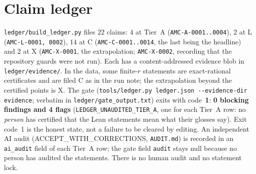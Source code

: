 \documentclass[10pt]{article}
\begin{document}
\section{Claim ledger}\label{sec:ledger}
\texttt{ledger/build\_ledger.py} files $22$ claims: $4$ at Tier~A (\texttt{AMC-A-0001..0004}), $2$ at L (\texttt{AMC-L-0001, 0002}), $14$ at C (\texttt{AMC-C-0001..0014}, the last being the headline) and $2$ at X (\texttt{AMC-X-0001}, the extrapolation; \texttt{AMC-X-0002}, recording that the repository guards were not run). Each has a
content-addressed evidence blob in \texttt{ledger/evidence/}. In the data, some finite-$r$ statements are exact-rational certificates and are filed C as in the run note; the extrapolation beyond the certified points is X. The gate (\texttt{tools/ledger.py ledger.json -{}-evidence-dir evidence}; verbatim in
\texttt{ledger/gate\_output.txt}) exits with code~\textbf{1}: \textbf{0 blocking findings and 4 flags} (\texttt{LEDGER\_UNAUDITED\_TIER\_A}, one for each Tier~A row: no \emph{person} has certified that the Lean statements mean what their glosses say). Exit code~1 is the honest state, not a failure to be cleared by editing. An independent AI audit (ACCEPT\_WITH\_CORRECTIONS, \texttt{AUDIT.md}) is recorded in an \texttt{ai\_audit} field of each Tier~A row; the gate field \texttt{audit} stays null because no person has audited the statements. There is no human audit and no statement lock.

\end{document}
